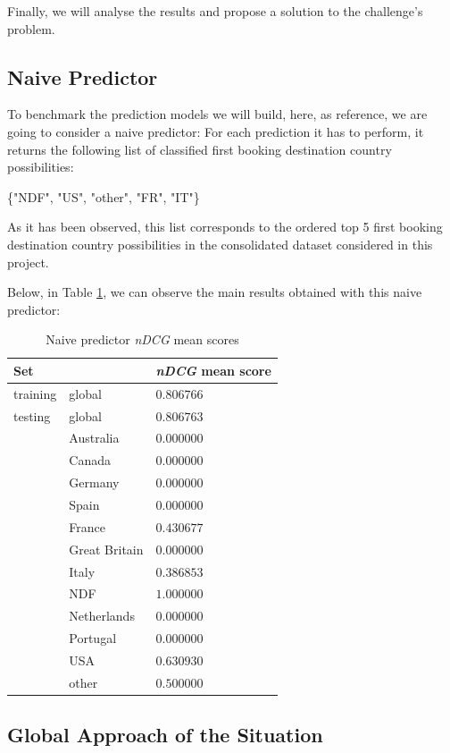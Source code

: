 \documentclass[twocolumn, switch]{article}
\begin{document}
Finally, we will analyse the results and propose a solution to the challenge's problem.

\subsection{Naive Predictor}

To benchmark the prediction models we will build, here, as reference, we are going to consider a naive predictor: For each prediction it has to perform, it returns the following list of classified first booking destination country possibilities:

\{"NDF", "US", "other", "FR", "IT"\}

As it has been observed, this list corresponds to the ordered top 5 first booking destination country possibilities in the consolidated dataset considered in this project.

Below, in Table \ref{tab:naive}, we can observe the main results obtained with this naive predictor:

\begin{table}[H]
\caption{Naive predictor \textit{nDCG} mean scores}
\centering
\begin{tabular}{lll}
\toprule
Set & & \textit{nDCG} mean score \\
\midrule
training & global & $0.806766$ \\
testing & global & $0.806763$ \\
& Australia & $0.000000$ \\
& Canada & $0.000000$ \\
& Germany & $0.000000$ \\
& Spain & $0.000000$ \\
& France & $0.430677$ \\
& Great Britain & $0.000000$ \\
& Italy & $0.386853$ \\
& NDF & $1.000000$ \\
& Netherlands & $0.000000$ \\
& Portugal & $0.000000$ \\
& USA & $0.630930$ \\
& other & $0.500000$ \\
\bottomrule
\end{tabular}
\label{tab:naive}
\end{table}

\subsection{Global Approach of the Situation}
\end{document}
